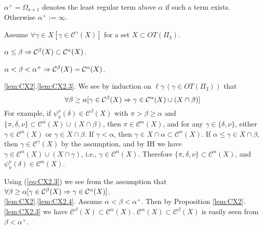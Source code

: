 \documentclass{article}
\begin{document}
$\alpha^{+}=\Omega_{a+1}$ denotes the least regular term above $\alpha$ if such a term exists. 
Otherwise $\alpha^{+}:=\infty$.






\begin{proposition}\label{lem:CX2} 
Assume $\forall\gamma\in X[ \gamma\in\mathcal{C}^{\gamma}(X)]$ for a set $X\subset OT(\Pi_{3})$.


\benu
\item\label{lem:CX2.3} 
$\alpha\leq\beta \Rightarrow \mathcal{C}^{\beta}(X)\subset \mathcal{C}^{\alpha}(X)$.


\item\label{lem:CX2.4} 
$\alpha<\beta<\alpha^{+} \Rightarrow \mathcal{C}^{\beta}(X)=\mathcal{C}^{\alpha}(X)$.
\eenu
\end{proposition}
\bprf
\ref{lem:CX2}.\ref{lem:CX2.3}.
We see by induction on $\ell\gamma\,(\gamma\in OT(\Pi_{3}))$ that
\begin{equation}\label{eq:CX2.3}
\forall\beta\geq\alpha[\gamma\in \mathcal{C}^{\beta}(X) \Rightarrow \gamma\in \mathcal{C}^{\alpha}(X)\cup(X\cap\beta)]
\end{equation}
For example, if $\psi_{\pi}^{\nu}(\delta)\in \mathcal{C}^{\beta}(X)$ with $\pi>\beta\geq\alpha$
and $\{\pi,\delta,\nu\}\subset\mathcal{C}^{\alpha}(X)\cup(X\cap\beta)$, then 
$\pi\in\mathcal{C}^{\alpha}(X)$, and 
for any $\gamma\in\{\delta,\nu\}$, either $\gamma\in\mathcal{C}^{\alpha}(X)$ or
$\gamma\in X\cap\beta$. If $\gamma<\alpha$, then $\gamma\in X\cap\alpha\subset\mathcal{C}^{\alpha}(X)$.
If $\alpha\leq\gamma\in X\cap\beta$, then $\gamma\in\mathcal{C}^{\gamma}(X)$ by the assumption, and
by IH we have $\gamma\in\mathcal{C}^{\alpha}(X)\cup(X\cap\gamma)$, i.e., $\gamma\in\mathcal{C}^{\alpha}(X)$.
Therefore $\{\pi,\delta,\nu\}\subset\mathcal{C}^{\alpha}(X)$, and 
$\psi_{\pi}^{\nu}(\delta)\in\mathcal{C}^{\alpha}(X)$.

Using (\ref{eq:CX2.3}) we see from the assumption that
$
\forall\beta\geq\alpha[ \gamma\in\mathcal{C}^{\beta}(X) \Rightarrow \gamma\in\mathcal{C}^{\alpha}(X)]
$.
\\
\ref{lem:CX2}.\ref{lem:CX2.4}.
Assume $\alpha<\beta<\alpha^{+}$. Then by Proposition \ref{lem:CX2}.\ref{lem:CX2.3} we have
$\mathcal{C}^{\beta}(X)\subset\mathcal{C}^{\alpha}(X)$.
$\mathcal{C}^{\alpha}(X) \subset\mathcal{C}^{\beta}(X)$ is easily seen from $\beta<\alpha^{+}$.
\eprf
\end{document}
